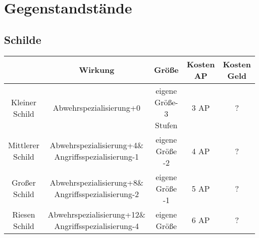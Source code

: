 \chapter{Gegenstandstände}
\section{Schilde}
\begin{tabulary}{\textwidth}{|C|C|C|C|C|}
\hline 
&Wirkung&Größe&Kosten AP &Kosten Geld\\ 
\hline
Kleiner Schild& Abwehrspezialisierung+0 &
eigene Größe-3 Stufen	&3 AP&?\\
\hline 
Mittlerer Schild& Abwehrspezialisierung+4\& Angriffsspezialisierung-1 &	
eigene Größe	-2&4 AP&?\\
\hline 
Großer Schild& Abwehrspezialisierung+8\& Angriffsspezialisierung-2 &	
eigene Größe	-1&5 AP&?\\
\hline 
Riesen Schild& Abwehrspezialisierung+12\& Angriffsspezialisierung-4 &
eigene Größe	&
6 AP&?\\
\hline 
\end{tabulary}
